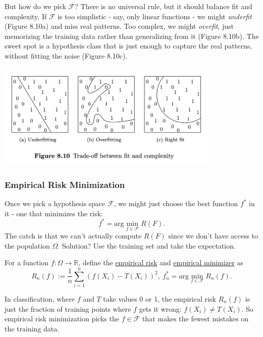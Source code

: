 But how do we pick $\mathcal{F}$? There is no universal rule, but it should balance fit and complexity. If 
$\mathcal{F}$ is too simplistic - say, only linear functions - we might \textit{underfit} (Figure 8.10a) and 
miss real patterns. Too complex, we might \textit{overfit}, just memorizing the training data rather than 
generalizing from it (Figure 8.10b). The sweet spot is a hypothesis class that is just enough to capture the 
real patterns, without fitting the noise (Figure 8.10c).

\begin{center}
	\includegraphics[width=0.8\textwidth]{Chapter 8/fig8-10}
\end{center}


\subsubsection{Empirical Risk Minimization}
Once we pick a hypothesis space $\mathcal{F}$, we might just choose the best function $f^*$ in it - one that 
minimizes the risk:
\[ f^* = \mathrm{arg}\min_{f \in \mathcal{F}} R(F). \]
The catch is that we can't actually compute $R(F)$ since we don't have access to the population $\Omega$. 
Solution? Use the training set and take the expectation.

\begin{definition}[]
\label{def:8.4.3}
For a function $f: \Omega \to \mathbb{R}$, define the \underline{empirical risk} and \underline{empirical 
minimizer} as 
\[ R_n(f) := \frac{1}{n}\sum_{i = 1}^{n}(f(X_i) - T(X_i))^2, \ f_n^* = \mathrm{arg}\min_{f \in \mathcal{F}} 
R_n(f). \]
\end{definition}

\begin{example}[Classification]
\label{ex:8.4.4}
In classification, where $f$ and $T$ take values 0 or 1, the empirical risk $R_n(f)$ is just the fraction of 
training points where $f$ gets it wrong: $f(X_i) \neq T(X_i)$. So empirical risk minimization picks the 
$f \in \mathcal{F}$ that makes the fewest mistakes on the training data.
\end{example}


